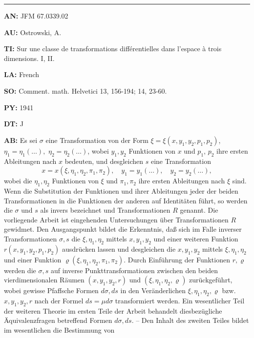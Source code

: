 \bigskip\par\noindent\hrule\bigskip\par

\item{\bf AN:} JFM 67.0339.02
\item{\bf AU:} Ostrowski, A.
\item{\bf TI:} Sur une classe de transformations diff\'erentielles dans
l'espace \`a trois dimensions. I, II.
\item{\bf LA:} French
\item{\bf SO:} Comment. math. Helvetici 13, 156-194; 14, 23-60.
\item{\bf PY:} 1941
\item{\bf DT:} J
\item{\bf AB:}{\parindent15pt
 Es sei $\sigma$ eine Transformation
von der Form $\xi= \xi(x, y_1, y_2, p_1, p_2)$, $\eta_1 = \eta_1(\ldots),$
$\eta_2= \eta_2(\ldots)$, wobei $y_1, y_2$
Funktionen von $x$ und $p_1$, $p_2$ ihre ersten Ableitungen
nach $x$
bedeuten, und desgleichen $s$ eine Transformation
$$
x = x(\xi, \eta_1, \eta_2, \pi_1, \pi_2),\quad
y_1 =y_1(\ldots),\quad
y_2 = y_2(\ldots),
$$
wobei die $\eta_1, \eta_2$ Funktionen von $\xi$ und $\pi_1, \pi_2$ ihre ersten Ableitungen nach
$\xi$ sind.
Wenn die Substitution der Funktionen und ihrer Ableitungen jeder der beiden
Transformationen in
die Funktionen der anderen auf Identit\"aten f\"uhrt, so werden
die $\sigma$ und $s$ als invers
bezeichnet und Transformationen $R$ genannt. Die vorliegende
Arbeit ist eingehenden Untersuchungen \"uber Transformationen $R$ gewidmet. Den
Ausgangspunkt bildet die Erkenntnis, da{\ss} sich im Falle inverser
Transformationen
$\sigma, s$ die $\xi,\eta_1, \eta_2$ mittels
$x, y_1, y_2$ und einer weiteren Funktion
$r (x, y_1, y_2, p_1, p_2)$
ausdr\"ucken lassen
und desgleichen die $x, y_1, y_2$ mittels $\xi, \eta_1, \eta_2$ und einer Funktion
$\varrho (\xi , \eta_1, \eta_2,
\pi_1, \pi_2)$. Durch Einf\"uhrung der Funktionen $r, \varrho$ werden die
$\sigma, s$ auf
inverse Punkttransformationen zwischen den beiden vierdimensionalen R\"aumen
$(x, y_1, y_2, r)$ und $(\xi,
\eta_1, \eta_2, \varrho)$ zur\"uckgef\"uhrt, wobei gewisse Pfaffsche Formen
$d\sigma, ds$
in den Ver\"anderlichen
$\xi, \eta_1, \eta_2, \varrho$ bzw. $x, y_1, y_2, r$ nach der Formel $ds = \mu d\sigma$
transformiert werden.
Ein wesentlicher Teil der weiteren Theorie im ersten Teile der
Arbeit behandelt diesbez\"ugliche
\"Aquivalenzfragen betreffend Formen $d\sigma, ds$. -- Den
Inhalt des zweiten Teiles bildet im wesentlichen die Bestimmung von
}
